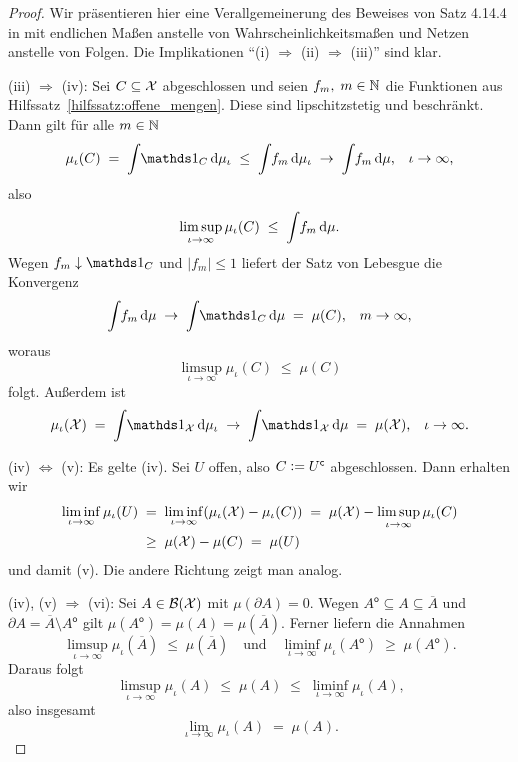 \documentclass[../thesis/thesis.tex]{subfiles}
\begin{document}
	\begin{proof}
		Wir präsentieren hier eine Verallgemeinerung des Beweises von Satz 4.14.4 in \cite[Kapitel 4.14]{Simon.2015} mit endlichen Maßen 
		anstelle von Wahrscheinlichkeitsmaßen und Netzen anstelle von Folgen. Die Implikationen \enquote{(i) $\Rightarrow$ (ii) $\Rightarrow$ (iii)} sind klar. 
		
		(iii) $\Rightarrow$ (iv): Sei $C \subseteq \mathcal{X}$ abgeschlossen und seien 
		$f_m, \; m \in \mathbb{N}$ die Funktionen aus Hilfssatz~\ref{hilfssatz:offene_mengen}. 
		Diese sind lipschitzstetig und beschränkt.
		Dann gilt für alle $m \in \mathbb{N}$
		$$\mu_\iota(C) \; = \; \measureint{}{\indfct_C}{\mu_\iota} \; \leq \; 
		\measureint{}{f_m}{\mu_\iota} \; \to \;
		\measureint{}{f_m}{\mu} \text{,} \quad \iota \to \infty \text{,}$$
		also 
		$$\limsup_{\iota \to \infty} \mu_\iota(C) \; \leq \; 
		\int_{} \, f_m \, \mathrm{d}\mu \text{.}$$
		Wegen $f_m \convdown \indfct_C$ und $| f_m | \leq 1$ 
		liefert der Satz von Lebesgue die Konvergenz
		$$\measureint{}{f_m}{\mu} \; \to \;
		\measureint{}{\indfct_C}{\mu} \; = \; \mu(C) \text{,} 
		\quad m \to \infty \text{,}$$
		woraus
		$$\limsup_{\iota \to \infty} \mu_\iota(C) \; \leq \; \mu(C)$$
		folgt. Außerdem ist 
		$$\mu_\iota(\X) \; = \; \measureint{}{\indfct_{\X}}{\mu_\iota} \; \to \; \measureint{}{\indfct_{\X}}{\mu} \; = \; \mu(\X) \text{,} 
		\quad \iota \to \infty \text{.}$$
		
		(iv) $\Leftrightarrow$ (v): Es gelte (iv). Sei $U$ offen, also 
		$C \vcentcolon = U^\mathsf{c}$ abgeschlossen. Dann erhalten wir
		\begin{align*}
			\liminf_{\iota \to \infty} \mu_\iota(U) \; &= \; \liminf_{\iota \to \infty} (\mu_\iota(\mathcal{X}) - \mu_\iota(C)) \; = \;
			\mu(\mathcal{X}) - \limsup_{\iota \to \infty} \mu_\iota(C) \\
			&\geq \; 
			\mu(\mathcal{X}) - \mu(C) \; = \; \mu(U)
		\end{align*}
		und damit (v). Die andere Richtung zeigt man analog.
		
		(iv), (v) $\Rightarrow$ (vi): Sei $A \in \mathcal{B}(\mathcal{X})$ mit 
		$\mu(\partial A) = 0$. Wegen
		$A^\mathsf{o} \subseteq A \subseteq \overline{A}$ und 
		$\partial A = \overline{A} \setminus A^\mathsf{o}$ gilt $\mu(A^\mathsf{o}) = 
		\mu(A) = \mu(\overline{A}) \text{.}$
		Ferner liefern die Annahmen
		$$\limsup_{\iota \to \infty} \mu_\iota(\overline{A}) \; \leq \; 
		\mu(\overline{A}) \quad \text{und} \quad 
		\liminf_{\iota \to \infty} \mu_\iota(A^\mathsf{o}) \; \geq \; 
		\mu(A^\mathsf{o}) \text{.}$$
		Daraus folgt
		$$\limsup_{\iota \to \infty} \mu_\iota(A) \; \leq \; 
		\mu(A) \; \leq \; \liminf_{\iota \to \infty} \mu_\iota(A) \text{,}$$
		also insgesamt
		$$\lim_{\iota \to \infty} \mu_\iota(A) \; = \; \mu(A) \text{.}$$
		

\end{proof}
\end{document}
